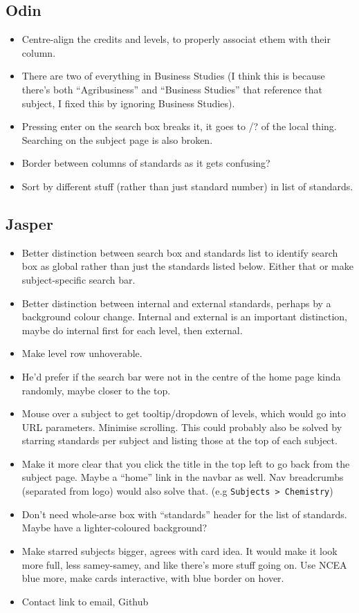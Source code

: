 \documentclass{article}
\begin{document}
\subsection*{Odin}
\begin{itemize}
    \item Centre-align the credits and levels, to properly associat ethem with their column.
    \item There are two of everything in Business Studies (I think this is because there's both ``Agribusiness'' and ``Business Studies'' that reference that subject, I fixed this by ignoring Business Studies). 
    \item Pressing enter on the search box breaks it, it goes to /? of the local thing. Searching on the subject page is also broken.
    \item Border between columns of standards as it gets confusing?
    \item Sort by different stuff (rather than just standard number) in list of standards.
\end{itemize}

\subsection*{Jasper}
\begin{itemize}
    \item Better distinction between search box and standards list to identify search box as global rather than just the standards listed below. Either that or make subject-specific search bar.
    \item Better distinction between internal and external standards, perhaps by a background colour change. Internal and external is an important distinction, maybe do internal first for each level, then external.
    \item Make level row unhoverable.
    \item He'd prefer if the search bar were not in the centre of the home page kinda randomly, maybe closer to the top.
    \item Mouse over a subject to get tooltip/dropdown of levels, which would go into URL parameters. Minimise scrolling. This could probably also be solved by starring standards per subject and listing those at the top of each subject.
    \item Make it more clear that you click the title in the top left to go back from the subject page. Maybe a ``home'' link in the navbar as well. Nav breadcrumbs (separated from logo) would also solve that. (e.g \texttt{Subjects > Chemistry})
    \item  Don't need whole-arse box with ``standards'' header for the list of standards. Maybe have a lighter-coloured background?
    \item Make starred subjects bigger, agrees with card idea. It would make it look more full, less samey-samey, and like there's more stuff going on. Use NCEA blue more, make cards interactive, with blue border on hover.
    \item Contact link to email, Github
\end{itemize}
\end{document}
